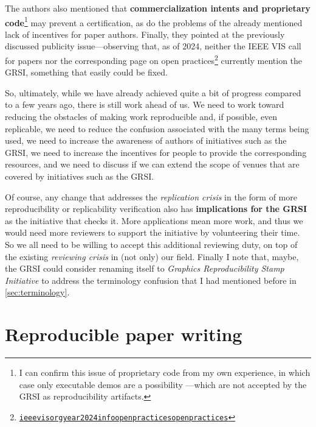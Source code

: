 \documentclass[conference,svgnames]{vgtc}                     %
\begin{document}
The authors also mentioned that \textbf{commercialization intents and proprietary code}\footnote{I can confirm this issue of proprietary code from my own experience, in which case only executable demos are a possibility \cite{Isenberg:2022:PEP}---which are not accepted by the GRSI as reproducibility artifacts.} may prevent a certification, as do the problems of the already mentioned lack of incentives for paper authors. Finally, they pointed at the previously discussed publicity issue---observing that, as of 2024, neither the IEEE VIS call for papers nor the corresponding page on open practices\footnote{\href{https://ieeevis.org/year/2024/info/open-practices/open-practices}{\texttt{ieeevisorg\discretionary{/}{}{/}year\discretionary{/}{}{/}2024\discretionary{/}{}{/}info\discretionary{/}{}{/}open\discretionary{}{-}{-}practices\discretionary{/}{}{/}open\discretionary{}{-}{-}practices}}} currently mention the GRSI, something that easily could be fixed.

So, ultimately, while we have already achieved quite a bit of progress compared to a few years ago, there is still work ahead of us. We need to work toward reducing the obstacles of making work reproducible and, if possible, even replicable, we need to reduce the confusion associated with the many terms being used, we need to increase the awareness of authors of initiatives such as the GRSI, we need to increase the incentives for people to provide the corresponding resources, and we need to discuss if we can extend the scope of venues that are covered by initiatives such as the GRSI.

Of course, any change that addresses the \emph{replication crisis} in the form of more reproducibility or replicability verification also has \textbf{implications for the GRSI} as the initiative that checks it. More applications mean more work, and thus we would need more reviewers to support the initiative by volunteering their time. So we all need to be willing to accept this additional reviewing duty, on top of the existing \emph{reviewing crisis} in (not only) our field. Finally I note that, maybe, the GRSI could consider renaming itself to \emph{Graphics Reproducibility Stamp Initiative} to address the terminology confusion that I had mentioned before in \autoref{sec:terminology}. 

\section{Reproducible paper writing}
\label{sec:analysis-reproducibility}
\end{document}
